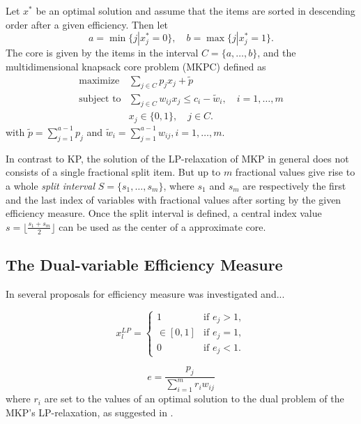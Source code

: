 Let $x^*$ be an optimal solution and assume that the items are sorted in
descending order after a given efficiency. Then let
\begin{displaymath}
  a = \min \{ j | x_j^* = 0 \}, \quad b = \max \{ j | x_j^* = 1 \}.
\end{displaymath}
The core is given by the items in the interval $C = \{ a, \ldots, b \}$,
and the multidimensional knapsack core problem (MKPC) defined as
\begin{align*}
  \text{maximize} & \sum_{j \in C} p_j x_j  + \tilde{p}\\
  \text{subject to} & \sum_{j \in C} w_{ij} x_j \leqslant c_i - \tilde{w}_i, \quad i = 1, \ldots, m\\
  & x_j \in \{0, 1\}, \quad j \in C.
\end{align*}
with $\tilde{p} = \sum^{a-1}_{j=1} p_j$  and $\tilde{w}_i = \sum^{a-1}_{j=1} w_{ij}, i = 1, \ldots, m$.

In contrast to KP, the solution of the LP-relaxation of MKP in general does not
consists of a single fractional split item. But up to $m$ fractional values give
rise to a whole \emph{split interval} $S = \{ s_1, \ldots, s_m\}$, where
$s_1$ and $s_m$ are respectively the first and the last index of variables with
fractional values after sorting by the given efficiency measure.
Once the split interval is defined, a central index value $s = \lfloor \frac{s_1+s_m}{2}\rfloor$
can be used as the center of a approximate core.

\subsection{The Dual-variable Efficiency Measure}
\label{subsec:dual}
In \cite{puchinger2006core} several proposals for efficiency measure was
investigated and...

\begin{displaymath}
 x_l^{LP} =
  \begin{cases}
    1         & \mbox{if } e_j > 1, \\
    \in [0,1] & \mbox{if } e_j = 1, \\
    0         & \mbox{if } e_j < 1.
  \end{cases}
\end{displaymath}

\begin{displaymath}
  e = \frac{p_j}{\sum_{i=1}^m r_iw_{ij}}
\end{displaymath}
where $r_i$ are set to the values of an optimal solution to the dual problem of
the MKP's LP-relaxation, as suggested in \cite{Chu-Beasley-1998}.


